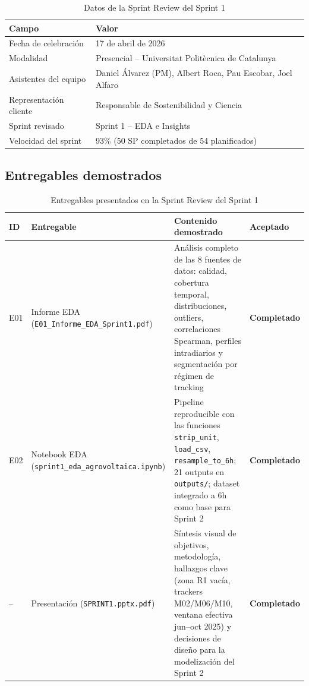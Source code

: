 \documentclass[12pt,a4paper]{article}
\newcommand{\done}{\textcolor{completed}{\textbf{Completado}}}
\begin{document}
\begin{table}[H]
\centering
\caption{Datos de la Sprint Review del Sprint 1}
\label{tab:review_s1_meta}
\renewcommand{\arraystretch}{1.3}
\begin{tabular}{ll}
\toprule
\textbf{Campo} & \textbf{Valor} \\
\midrule
Fecha de celebración   & 17 de abril de 2026 \\
Modalidad              & Presencial -- Universitat Politècnica de Catalunya \\
Asistentes del equipo  & Daniel Álvarez (PM), Albert Roca, Pau Escobar, Joel Alfaro \\
Representación cliente & Responsable de Sostenibilidad y Ciencia \\
Sprint revisado        & Sprint 1 -- EDA e Insights \\
Velocidad del sprint   & 93\% (50 SP completados de 54 planificados) \\
\bottomrule
\end{tabular}
\end{table}

\subsection{Entregables demostrados}

\begin{table}[H]
\centering
\caption{Entregables presentados en la Sprint Review del Sprint 1}
\label{tab:review_s1_entregables}
\renewcommand{\arraystretch}{1.3}
\begin{tabularx}{\textwidth}{llXl}
\toprule
\textbf{ID} & \textbf{Entregable} & \textbf{Contenido demostrado} & \textbf{Aceptado} \\
\midrule
E01
  & Informe EDA (\texttt{E01\_Informe\_EDA\_Sprint1.pdf})
  & Análisis completo de las 8 fuentes de datos: calidad, cobertura temporal, distribuciones, outliers, correlaciones Spearman, perfiles intradiarios y segmentación por régimen de tracking
  & \done \\
E02
  & Notebook EDA (\texttt{sprint1\_eda\_agrovoltaica.ipynb})
  & Pipeline reproducible con las funciones \texttt{strip\_unit}, \texttt{load\_csv}, \texttt{resample\_to\_6h}; 21 outputs en \texttt{outputs/}; dataset integrado a 6h como base para Sprint 2
  & \done \\
--
  & Presentación (\texttt{SPRINT1.pptx.pdf})
  & Síntesis visual de objetivos, metodología, hallazgos clave (zona R1 vacía, trackers M02/M06/M10, ventana efectiva jun--oct 2025) y decisiones de diseño para la modelización del Sprint 2
  & \done \\
\bottomrule
\end{tabularx}
\end{table}
\end{document}
